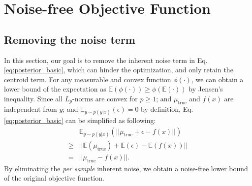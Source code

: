 \documentclass[letterpaper]{article} %
\begin{document}
\section{Noise-free Objective Function}
\label{sec:noise_free}

\subsection{Removing the noise term}

In this section, our goal is to remove the inherent noise term in Eq.\eqref{eq:posterior_basic}, which can hinder the optimization, and only retain the centroid term. 
%
%
For any measurable and convex function $\phi(\cdot)$, we can obtain a lower bound of the expectation as $\mathbb{E}(\phi(\cdot)) \geq \phi(\mathbb{E(\cdot)})$ by Jensen's inequality. Since all $L_p\text{-norms}$ are convex for $p\geq1$; and $\mu_{\text{true}}$ and $f(x)$ are independent from $y$; and $\mathbb{E}_{y \sim p(y|x)}(\epsilon) = 0$ by definition, Eq.\eqref{eq:posterior_basic} can be simplified as following:
\begin{equation}
    \label{eq:lowerbound_true}
    \begin{aligned}
        & \mathbb{E}_{y \sim p(y|x)}(||\mu_{\text{true}} + \epsilon -f(x)||) 
        \\
        \geq & ||\mathbb{E}(\mu_{\text{true}}) + \mathbb{E}(\epsilon) - \mathbb{E}(f(x))|| 
        \\
        = & ||\mu_{\text{true}} - f(x)||.
    \end{aligned}
\end{equation}
By eliminating the \textit{per sample} inherent noise, we obtain a noise-free lower bound of the original objective function.


%
%
\end{document}

